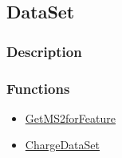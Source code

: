 \subsection{DataSet}\label{DataSet}
\subsubsection{Description}


\subsubsection{Functions}
\begin{itemize}
\item \hyperref[GetMS2forFeature]{GetMS2forFeature}
\item \hyperref[ChargeDataSet]{ChargeDataSet}
\end{itemize}

